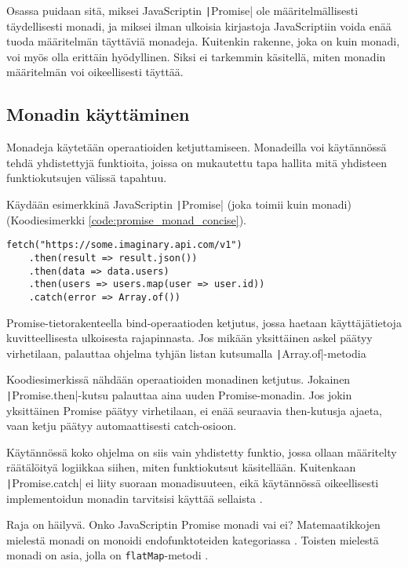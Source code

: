 Osassa  puidaan sitä, miksei JavaScriptin \texttt|Promise| ole määritelmällisesti täydellisesti monadi, ja miksei ilman ulkoisia kirjastoja JavaScriptiin voida enää tuoda määritelmän täyttäviä monadeja. Kuitenkin rakenne, joka on kuin monadi, voi myös olla erittäin hyödyllinen. Siksi ei tarkemmin käsitellä, miten monadin määritelmän voi oikeellisesti täyttää.


\subsection{Monadin käyttäminen}

Monadeja käytetään operaatioiden ketjuttamiseen. Monadeilla voi käytännössä tehdä yhdistettyjä funktioita, joissa on mukautettu tapa hallita mitä yhdisteen funktiokutsujen välissä tapahtuu.

Käydään esimerkkinä JavaScriptin \texttt|Promise| (joka toimii kuin monadi) (Koodiesimerkki \ref{code:promise_monad_concise}).

\begin{code}
    \begin{verbatim}
fetch("https://some.imaginary.api.com/v1") 
    .then(result => result.json()) 
    .then(data => data.users)
    .then(users => users.map(user => user.id))
    .catch(error => Array.of()) 
    \end{verbatim}
    \caption{Promise-tietorakenteella bind-operaatioden ketjutus, jossa haetaan käyttäjätietoja kuvitteellisesta ulkoisesta rajapinnasta. Jos mikään yksittäinen askel päätyy virhetilaan, palauttaa ohjelma tyhjän listan kutsumalla \texttt|Array.of|-metodia}
    \label{code:promise_monad_concise}
\end{code}

Koodiesimerkissä nähdään operaatioiden monadinen ketjutus. Jokainen \texttt|Promise.then|-kutsu palauttaa aina uuden Promise-monadin. Jos jokin yksittäinen Promise päätyy virhetilaan, ei enää seuraavia then-kutusja ajaeta, vaan ketju päätyy automaattisesti catch-osioon.

Käytännössä koko ohjelma on siis vain yhdistetty funktio, jossa ollaan määritelty räätälöityä logiikkaa siihen, miten funktiokutsut käsitellään. Kuitenkaan \texttt|Promise.catch| ei liity suoraan monadisuuteen, eikä käytännössä oikeellisesti implementoidun monadin tarvitsisi käyttää sellaista \cite{promises-spec-94}.

Raja on häilyvä. Onko JavaScriptin Promise monadi vai ei? Matemaatikkojen mielestä monadi on  monoidi endofunktoteiden kategoriassa \cite{bartosz_category_for_progamers_10,monad_wikipedia,stackoverflow_what_monad}. Toisten mielestä monadi on asia, jolla on \texttt{flatMap}-metodi \cite{stackoverflow_flatmap_monad}.

